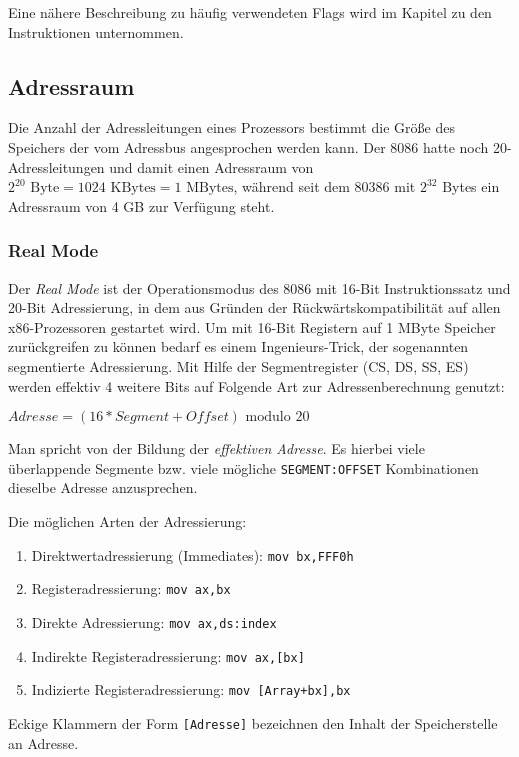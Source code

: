 Eine nähere Beschreibung zu häufig verwendeten Flags wird im Kapitel zu den Instruktionen unternommen.

\subsection{Adressraum}

Die Anzahl der Adressleitungen eines Prozessors bestimmt die Größe des Speichers der vom Adressbus angesprochen werden kann. Der 8086 hatte noch 20-Adressleitungen und damit einen Adressraum von $2^{20} \text{ Byte} = 1024 \text{ KBytes} = 1 \text{ MBytes}$, während seit dem 80386 mit $2^{32}$ Bytes ein Adressraum von 4 GB zur Verfügung steht.

\subsubsection{Real Mode}

Der \emph{Real Mode} ist der Operationsmodus des 8086 mit 16-Bit Instruktionssatz und 20-Bit Adressierung, in dem aus Gründen der Rückwärtskompatibilität auf allen x86-Prozessoren gestartet wird. Um mit 16-Bit Registern auf 1 MByte Speicher zurückgreifen zu können bedarf es einem Ingenieurs-Trick, der sogenannten segmentierte Adressierung. Mit Hilfe der Segmentregister (CS, DS, SS, ES) werden effektiv 4 weitere Bits auf Folgende Art zur Adressenberechnung genutzt:

$Adresse = (16 * Segment + Offset) \text{ modulo } 20$

Man spricht von der Bildung der \emph{effektiven Adresse}. Es hierbei viele überlappende Segmente bzw. viele mögliche \texttt{SEGMENT:OFFSET} Kombinationen dieselbe Adresse anzusprechen.

Die möglichen Arten der Adressierung:

\begin{enumerate}
\item Direktwertadressierung (Immediates): {\tt mov bx,FFF0h}
\item Registeradressierung: {\tt mov 	ax,bx}
\item Direkte Adressierung: {\tt mov 	ax,ds:index}
\item Indirekte Registeradressierung: {\tt mov ax,[bx]}
\item Indizierte Registeradressierung: {\tt mov [Array+bx],bx}
\end{enumerate}
Eckige Klammern der Form {\tt [Adresse]} bezeichnen den Inhalt der Speicherstelle an Adresse.

